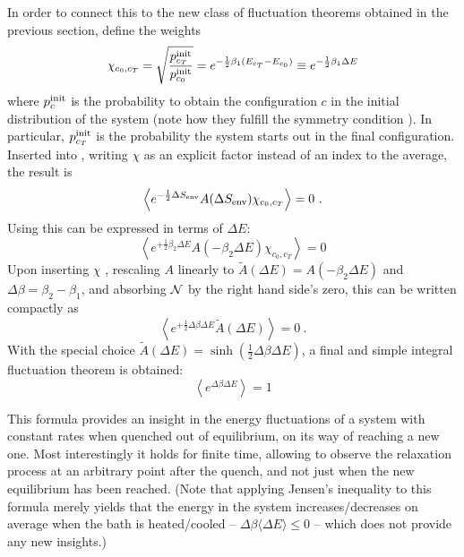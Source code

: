 In order to connect this to the new class of fluctuation theorems obtained in the previous section, define the weights
%
\begin{equation}
	\label{eqn:chi example value}
	  \chi_{c_0,c_T}
	= \sqrt{\frac{p_{c_T}^{\text{init}}}{p_{c_0}^{\text{init}}}}
	= e^{-\frac12\beta_1(E_{c_T} - E_{c_0})}
	\equiv e^{-\frac12\beta_1\Delta E}
\end{equation}
%
where \(p_c^{\text{init}}\) is the probability to obtain the configuration \(c\) in the initial distribution of the system (note how they fulfill the symmetry condition ). In particular, \(p_{c_T}^{\text{init}}\) is the probability the system starts out in the final configuration. Inserted into , writing \(\chi\) as an explicit factor instead of an index to the average, the result is
%
\begin{equation}
	\left\langle e^{-\frac12\Delta S_\text{env}} A(\Delta S_\text{env}) \chi_{c_0,c_T} \right\rangle = 0 ~.
\end{equation}
%
Using  this can be expressed in terms of \(\Delta E\):
%
\begin{equation}
	\left\langle e^{+\frac12\beta_2\Delta E} A(-\beta_2\Delta E) \chi_{c_0,c_T} \right\rangle = 0
\end{equation}
%
Upon inserting \(\chi\) , rescaling \(A\) linearly to \(\tilde A(\Delta E) = A(-\beta_2\Delta E)\) and \(\Delta\beta = \beta_2-\beta_1\), and absorbing \(\mathcal{N}\) by the right hand side's zero, this can be written compactly as
%
\begin{equation}
	\left\langle e^{+\frac12\Delta\beta\Delta E} \tilde A(\Delta E) \right\rangle = 0 ~.
\end{equation}
%
With the special choice \(\tilde A(\Delta E) = \sinh(\frac12\Delta\beta\Delta E)\), a final and simple integral fluctuation theorem is obtained:
%
\begin{equation}
	\label{eqn:tingie quench fluctuation}
	\boxed{\left\langle e^{\Delta\beta \Delta E}\right\rangle = 1}
\end{equation}

This formula provides an insight in the energy fluctuations of a system with constant rates when quenched out of equilibrium, on its way of reaching a new one. Most interestingly it holds for finite time, allowing to observe the relaxation process at an arbitrary point after the quench, and not just when the new equilibrium has been reached. (Note that applying Jensen's inequality to this formula merely yields that the energy in the system increases/decreases on average when the bath is heated/cooled -- \(\Delta\beta\langle\Delta E\rangle\leq0\) -- which does not provide any new insights.)








